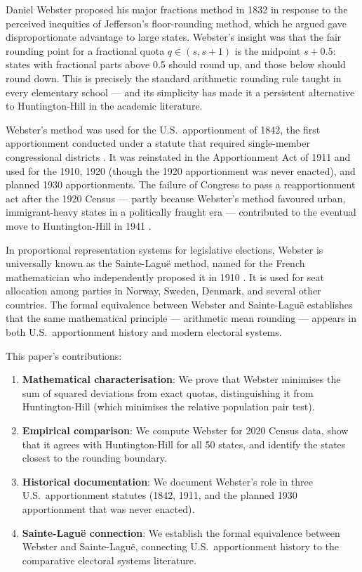 Daniel Webster proposed his major fractions method in 1832 in response
to the perceived inequities of Jefferson's floor-rounding method,
which he argued gave disproportionate advantage to large states.
Webster's insight was that the fair rounding point for a fractional
quota $q \in (s, s+1)$ is the midpoint $s + 0.5$: states with
fractional parts above 0.5 should round up, and those below should
round down.
This is precisely the standard arithmetic rounding rule taught in
every elementary school --- and its simplicity has made it a persistent
alternative to Huntington-Hill in the academic literature.

Webster's method was used for the U.S.\ apportionment of 1842,
the first apportionment conducted under a statute that required
single-member congressional districts \citep{apportionment1842}.
It was reinstated in the Apportionment Act of 1911 and used for
the 1910, 1920 (though the 1920 apportionment was never enacted),
and planned 1930 apportionments.
The failure of Congress to pass a reapportionment act after the 1920
Census --- partly because Webster's method favoured urban, immigrant-heavy
states in a politically fraught era --- contributed to the eventual
move to Huntington-Hill in 1941 \citep{balinski1982fair}.

In proportional representation systems for legislative elections,
Webster is universally known as the Sainte-Lagu\"e method, named for
the French mathematician who independently proposed it in 1910
\citep{sainte-lague1910}.
It is used for seat allocation among parties in Norway, Sweden, Denmark,
and several other countries.
The formal equivalence between Webster and Sainte-Lagu\"e establishes
that the same mathematical principle --- arithmetic mean rounding ---
appears in both U.S.\ apportionment history and modern electoral systems.

This paper's contributions:
\begin{enumerate}
  \item \textbf{Mathematical characterisation}: We prove that Webster
    minimises the sum of squared deviations from exact quotas,
    distinguishing it from Huntington-Hill (which minimises the
    relative population pair test).
  \item \textbf{Empirical comparison}: We compute Webster for 2020
    Census data, show that it agrees with Huntington-Hill for all 50
    states, and identify the states closest to the rounding boundary.
  \item \textbf{Historical documentation}: We document Webster's
    role in three U.S.\ apportionment statutes (1842, 1911, and the
    planned 1930 apportionment that was never enacted).
  \item \textbf{Sainte-Lagu\"e connection}: We establish the formal
    equivalence between Webster and Sainte-Lagu\"e, connecting
    U.S.\ apportionment history to the comparative electoral systems
    literature.
\end{enumerate}

